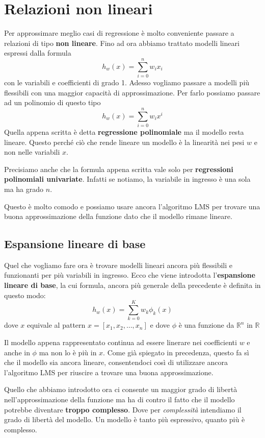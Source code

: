 \chapter{Relazioni non lineari}
Per approssimare meglio casi di regressione \`e molto conveniente passare a relazioni di tipo \textbf{non lineare}.
Fino ad ora abbiamo trattato modelli lineari espressi dalla formula
\[ h_w(x) = \sum_{i = 0}^n w_i x_i \]
con le variabili e coefficienti di grado 1. Adesso vogliamo passare a modelli pi\`u flessibili con una maggior
capacit\`a di approssimazione. Per farlo possiamo passare ad un polinomio di questo tipo
\[ h_w(x) = \sum_{i = 0}^n w_i x^i \]
Quella appena scritta \`e detta \textbf{regressione polinomiale} ma il modello resta lineare. Questo perch\'e ci\`o che
rende lineare un modello \`e la linearit\`a nei pesi $w$ e non nelle variabili $x$.

Precisiamo anche che la formula appena scritta vale solo per \textbf{regressioni polinomiali univariate}. Infatti se
notiamo, la variabile in ingresso \`e una sola ma ha grado $n$.

Questo \`e molto comodo e possiamo usare ancora l'algoritmo LMS per trovare una buona approssimazione della funzione
dato che il modello rimane lineare.

\section{Espansione lineare di base}
Quel che vogliamo fare ora \`e trovare modelli lineari ancora pi\`u flessibili e funzionanti per pi\`u variabili in
ingresso. Ecco che viene introdotta l'\textbf{espansione lineare di base}, la cui formula, ancora pi\`u generale della
precedente  \`e definita in questo modo:
\[ h_w(x) = \sum_{k = 0}^K w_k \phi_k(x) \]
dove $x$ equivale al pattern $x = [x_1, x_2, \dots, x_n]$ e dove $\phi$ \`e una funzione da
$\mathbb{R}^n$ in $\mathbb{R}$

Il modello appena rappresentato continua ad essere linerare nei coefficienti $w$ e anche in $\phi$ ma non lo \`e pi\`u
in $x$. Come gi\`a spiegato in precedenza, questo fa s\`i che il modello sia ancora lineare, consentendoci cos\`i di
utilizzare ancora l'algoritmo LMS per riuscire a trovare una buona approssimazione.

Quello che abbiamo introdotto ora ci consente un maggior grado di libert\`a nell'approssimazione della funzione ma ha
di contro il fatto che il modello potrebbe diventare \textbf{troppo complesso}. Dove per \emph{complessit\`a} intendiamo
il grado di libert\`a del modello. Un modello \`e tanto pi\`u espressivo, quanto pi\`u \`e complesso.